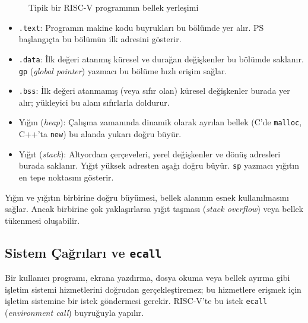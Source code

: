 \begin{figure}[H]
\caption{Tipik bir RISC-V programının bellek yerleşimi}
\label{fig:bellek-haritasi}
\end{figure}

\begin{itemize}[nosep]
\item \texttt{.text}: Programın makine kodu buyrukları bu bölümde yer alır. PS başlangıçta bu bölümün ilk adresini gösterir.
\item \texttt{.data}: İlk değeri atanmış küresel ve durağan değişkenler bu bölümde saklanır. \texttt{gp} (\emph{global pointer}) yazmacı bu bölüme hızlı erişim sağlar.
\item \texttt{.bss}: İlk değeri atanmamış (veya sıfır olan) küresel değişkenler burada yer alır; yükleyici bu alanı sıfırlarla doldurur.
\item Yığın (\emph{heap}): Çalışma zamanında dinamik olarak ayrılan bellek (C'de \texttt{malloc}, C++'ta \texttt{new}) bu alanda yukarı doğru büyür.
\item Yığıt (\emph{stack}): Altyordam çerçeveleri, yerel değişkenler ve dönüş adresleri burada saklanır. Yığıt yüksek adresten aşağı doğru büyür. \texttt{sp} yazmacı yığıtın en tepe noktasını gösterir.
\end{itemize}

Yığın ve yığıtın birbirine doğru büyümesi, bellek alanının esnek kullanılmasını sağlar. Ancak birbirine çok yaklaşırlarsa yığıt taşması (\emph{stack overflow}) veya bellek tükenmesi oluşabilir.

\subsection{Sistem Çağrıları ve \texttt{ecall}}
\label{sec:ecall}

Bir kullanıcı programı, ekrana yazdırma, dosya okuma veya bellek ayırma gibi işletim sistemi hizmetlerini doğrudan gerçekleştiremez; bu hizmetlere erişmek için işletim sistemine bir istek göndermesi gerekir. RISC-V'te bu istek \texttt{ecall} (\emph{environment call}) buyruğuyla yapılır.

